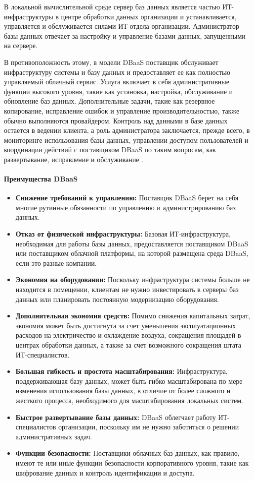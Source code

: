 В локальной вычислительной среде сервер баз данных является частью ИТ-инфраструктуры в центре обработки данных организации и устанавливается, 
управляется и обслуживается силами ИТ-отдела организации. Администратор базы данных отвечает за настройку и управление базами данных, 
запущенными на сервере.

В противоположность этому, в модели DBaaS поставщик обслуживает инфраструктуру системы и базу данных и предоставляет ее как полностью 
управляемый облачный сервис. Услуга включает в себя административные функции высокого уровня, такие как установка, настройка, обслуживание 
и обновление баз данных. Дополнительные задачи, такие как резервное копирование, исправление ошибок и управление производительностью, также 
обычно выполняются провайдером. Контроль над данными в базе данных остается в ведении клиента, а роль администратора заключается, прежде всего, в мониторинге использования базы данных,
управлении доступом пользователей и координации действий с поставщиком DBaaS по таким вопросам, как развертывание, исправление и обслуживание \autocite{DBaaS}. 

\paragraph{Преимущества DBaaS}

\begin{itemize}
\item \textbf{Снижение требований к управлению:} Поставщик DBaaS берет на себя многие рутинные обязанности по управлению и администрированию баз данных.
\item \textbf{Отказ от физической инфраструктуры:} Базовая ИТ-инфраструктура, необходимая для работы базы данных, предоставляется поставщиком DBaaS или поставщиком облачной платформы, на которой размещена среда DBaaS, если это разные компании.
\item \textbf{Экономия на оборудовании:} Поскольку инфраструктура системы больше не находится в помещении, клиентам не нужно инвестировать в серверы баз данных или планировать постоянную модернизацию оборудования.
\item \textbf{Дополнительная экономия средств:} Помимо снижения капитальных затрат, экономия может быть достигнута за счет уменьшения эксплуатационных расходов на электричество и охлаждение воздуха, сокращения площадей в центрах обработки данных, а также за счет возможного сокращения штата ИТ-специалистов.
\item \textbf{Большая гибкость и простота масштабирования:} Инфраструктура, поддерживающая базу данных, может быть гибко масштабирована по мере изменения использования базы данных, в отличие от более сложного и жесткого процесса, необходимого для масштабирования локальных систем.
\item \textbf{Быстрое развертывание базы данных:} DBaaS облегчает работу ИТ-специалистов организации, поскольку им не нужно заботиться о решении административных задач.
\item \textbf{Функции безопасности:} Поставщики облачных баз данных, как правило, имеют те или иные функции безопасности корпоративного уровня, такие как шифрование данных и контроль идентификации и доступа.
\end{itemize}


